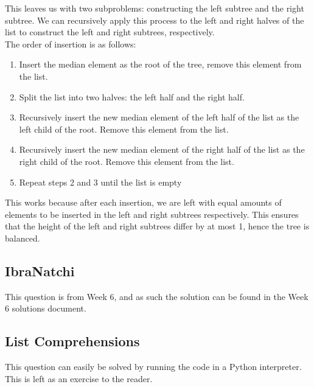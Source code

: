 \documentclass[12pt]{article}
\begin{document}
This leaves us with two subproblems: constructing the left subtree and the right subtree. We can recursively apply this process to the left and right halves of the list to construct the left and right subtrees, respectively.
\\
The order of insertion is as follows:
\begin{enumerate}
    \item Insert the median element as the root of the tree, remove this element from the list.
    \item Split the list into two halves: the left half and the right half.
    \item Recursively insert the new median element of the left half of the list as the left child of the root. Remove this element from the list.
    \item Recursively insert the new median element of the right half of the list as the right child of the root. Remove this element from the list.
    \item Repeat steps 2 and 3 until the list is empty
\end{enumerate}

This works because after each insertion, we are left with equal amounts of elements to be inserted in the left and right subtrees respectively. This ensures that the height of the left and right subtrees differ by at most 1, hence the tree is balanced.

\subsection{IbraNatchi}
This question is from Week 6, and as such the solution can be found in the Week 6 solutions document.

\subsection{List Comprehensions}
This question can easily be solved by running the code in a Python interpreter. This is left as an exercise to the reader.
\end{document}
